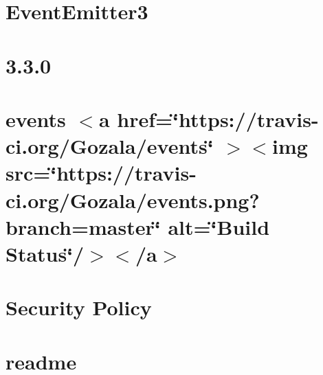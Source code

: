 \documentclass[twoside]{book}
\newcommand{\+}{\discretionary{\mbox{\scriptsize$\hookleftarrow$}}{}{}}
\begin{document}
\chapter{Event\+Emitter3}
\label{md__c___users_vaishnavi_jadhav__desktop__developer_code_mean_stack_example_client_node_modules_eventemitter3__r_e_a_d_m_e}

\chapter{3.3.0}
\label{md__c___users_vaishnavi_jadhav__desktop__developer_code_mean_stack_example_client_node_modules_events__history}

\chapter{events \texorpdfstring{$<$}{<}a href=\char`\"{}https\+://travis-\/ci.\+org/\+Gozala/events\char`\"{} \texorpdfstring{$>$}{>}\texorpdfstring{$<$}{<}img src=\char`\"{}https\+://travis-\/ci.\+org/\+Gozala/events.\+png?branch=master\char`\"{} alt=\char`\"{}\+Build Status\char`\"{}/\texorpdfstring{$>$}{>}\texorpdfstring{$<$}{<}/a\texorpdfstring{$>$}{>}}
\label{md__c___users_vaishnavi_jadhav__desktop__developer_code_mean_stack_example_client_node_modules_events__readme}

\chapter{Security Policy}
\label{md__c___users_vaishnavi_jadhav__desktop__developer_code_mean_stack_example_client_node_modules_events_security}

\chapter{readme}
\label{md__c___users_vaishnavi_jadhav__desktop__developer_code_mean_stack_example_client_node_modules_execa_readme}

\end{document}
